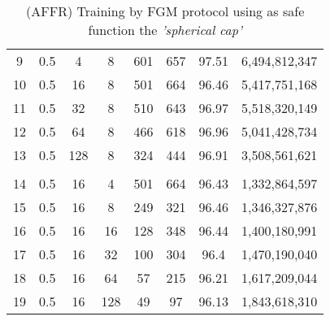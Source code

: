 \begin{table}[H]
\begin{tabular}{|c|c|c|c|c|c|c|c|}
        9                      & 0.5                   & 4                     & 8                     & 601                   & 657                   & 97.51                 & 6,494,812,347            \\
        10                     & 0.5                   & 16                    & 8                     & 501                   & 664                   & 96.46                 & 5,417,751,168            \\
        11                     & 0.5                   & 32                    & 8                     & 510                   & 643                   & 96.97                 & 5,518,320,149            \\
        12                     & 0.5                   & 64                    & 8                     & 466                   & 618                   & 96.96                 & 5,041,428,734            \\
        13                     & 0.5                   & 128                   & 8                     & 324                   & 444                   & 96.91                 & 3,508,561,621            \\
        \hline
        \multicolumn{1}{|l|}{} & \multicolumn{1}{l|}{} & \multicolumn{1}{l|}{} & \multicolumn{1}{l|}{} & \multicolumn{1}{l|}{} & \multicolumn{1}{l|}{} & \multicolumn{1}{l|}{} & \multicolumn{1}{l|}{}    \\
        \hline
        14                     & 0.5                   & 16                    & 4                     & 501                   & 664                   & 96.43                 & 1,332,864,597            \\
        15                     & 0.5                   & 16                    & 8                     & 249                   & 321                   & 96.46                 & 1,346,327,876            \\
        16                     & 0.5                   & 16                    & 16                    & 128                   & 348                   & 96.44                 & 1,400,180,991            \\
        17                     & 0.5                   & 16                    & 32                    & 100                   & 304                   & 96.4                  & 1,470,190,040            \\
        18                     & 0.5                   & 16                    & 64                    & 57                    & 215                   & 96.21                 & 1,617,209,044            \\
        19                     & 0.5                   & 16                    & 128                   & 49                    & 97                    & 96.13                 & 1,843,618,310            \\
        \hline
    \end{tabular}
    \caption{(AFFR) Training by FGM protocol using as safe function the \emph{'spherical cap'}}
    \label{tab:table-fgm-sf2-nlp-exp}
\end{table}
